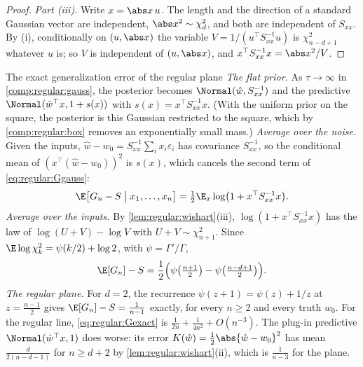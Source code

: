 \begin{refsection}
\begin{proof}
\emph{Part (iii).} Write $x=\abs x\,u$. The length and the direction of a standard Gaussian vector are independent, $\abs x^2\sim\chi^2_d$, and both are independent of $S_{xx}$. By (i), conditionally on $(u,\abs x)$ the variable $V=1/(u^\top S_{xx}^{-1}u)$ is $\chi^2_{n-d+1}$ whatever $u$ is; so $V$ is independent of $(u,\abs x)$, and $x^\top S_{xx}^{-1}x=\abs x^2/V$.
\end{proof}

\begin{computation}{The exact generalization error of the regular plane}\label{comp:regular:flat}
\step \emph{The flat prior.} As $\tau\to\infty$ in \cref{comp:regular:gauss}, the posterior becomes $\Normal(\hat w,S_{xx}^{-1})$ and the predictive $\Normal(\hat w^\top x,1+s(x))$ with $s(x)=x^\top S_{xx}^{-1}x$. (With the uniform prior on the square, the posterior is this Gaussian restricted to the square, which by \cref{comp:regular:box} removes an exponentially small mass.)
\step \emph{Average over the noise.} Given the inputs, $\hat w-w_0=S_{xx}^{-1}\sum_ix_i\varepsilon_i$ has covariance $S_{xx}^{-1}$, so the conditional mean of $(x^\top(\hat w-w_0))^2$ is $s(x)$, which cancels the second term of \eqref{eq:regular:Ggauss}:
\[
\E\bigl[G_n-S\bigm|x_1,\dots,x_n\bigr]=\tfrac12\E_x\log\bigl(1+x^\top S_{xx}^{-1}x\bigr).
\]
\step \emph{Average over the inputs.} By \cref{lem:regular:wishart}(iii), $\log(1+x^\top S_{xx}^{-1}x)$ has the law of $\log(U+V)-\log V$ with $U+V\sim\chi^2_{n+1}$. Since $\E\log\chi^2_k=\psi(k/2)+\log2$, with $\psi=\Gamma'/\Gamma$,
\begin{equation}\label{eq:regular:Gexact}
\E[G_n]-S=\frac12\Bigl(\psi\bigl(\tfrac{n+1}2\bigr)-\psi\bigl(\tfrac{n-d+1}2\bigr)\Bigr).
\end{equation}
\step \emph{The regular plane.} For $d=2$, the recurrence $\psi(z+1)=\psi(z)+1/z$ at $z=\frac{n-1}2$ gives $\E[G_n]-S=\frac1{n-1}$ exactly, for every $n\ge2$ and every truth $w_0$. For the regular line, \eqref{eq:regular:Gexact} is $\frac1{2n}+\frac1{4n^2}+O(n^{-3})$. The plug-in predictive $\Normal(\hat w^\top x,1)$ does worse: its error $K(\hat w)=\frac12\abs{\hat w-w_0}^2$ has mean $\frac d{2(n-d-1)}$ for $n\ge d+2$ by \cref{lem:regular:wishart}(ii), which is $\frac1{n-3}$ for the plane.
\end{computation}


\end{refsection}
